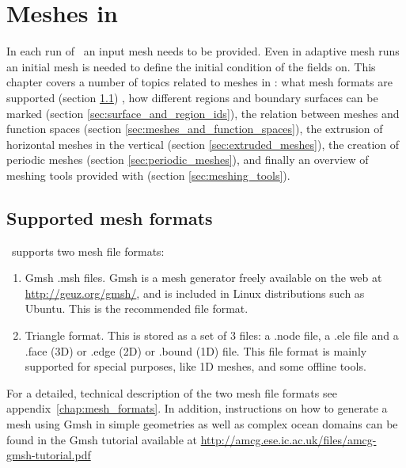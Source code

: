\chapter{Meshes in \fluidity}\label{chap:meshes}

In each run of \fluidity\ an input mesh needs to 
be provided. Even in adaptive mesh runs an initial mesh is needed
to define the initial condition of the fields on. 
This chapter covers a number of topics 
related to meshes in \fluidity:  what
mesh formats are supported (section \ref{sec:supported_mesh_formats})
, how different regions and boundary surfaces can be
marked (section \ref{sec:surface_and_region_ids}), 
the relation between meshes and function spaces (section
\ref{sec:meshes_and_function_spaces}), the extrusion of 
horizontal meshes in the vertical (section \ref{sec:extruded_meshes}), 
the creation of periodic meshes (section \ref{sec:periodic_meshes}),
and finally an overview of meshing tools provided with \fluidity (section
\ref{sec:meshing_tools}).

\section{Supported mesh formats}
\label{sec:supported_mesh_formats}
\fluidity\ supports two mesh file formats:
\begin{enumerate}
\item Gmsh .msh files. Gmsh is a mesh generator freely available on the
web at \url{http://geuz.org/gmsh/}, and is included in Linux distributions 
such as Ubuntu. This is the recommended file format.
\item Triangle format. This is stored as a set of 3 files: a .node file,
a .ele file and a .face (3D) or .edge (2D) or .bound (1D) file. This file format
is mainly supported for special purposes, like 1D meshes, and some offline 
tools.
\end{enumerate}

For a detailed, technical description of the two mesh file formats see 
appendix~\ref{chap:mesh_formats}. In addition, instructions on how
to generate a mesh using Gmsh in simple geometries as well as complex
ocean domains can be found in the Gmsh tutorial available at
\url{http://amcg.ese.ic.ac.uk/files/amcg-gmsh-tutorial.pdf}

